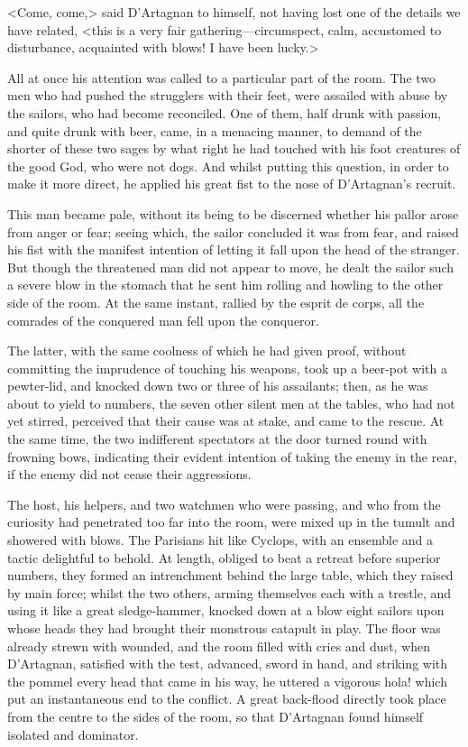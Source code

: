 <Come, come,> said D'Artagnan to himself, not having lost one of the details we have related, <this is a very fair gathering—circumspect, calm, accustomed to disturbance, acquainted with blows!  I have been lucky.>

All at once his attention was called to a particular part of the room. The two men who had pushed the strugglers with their feet, were assailed with abuse by the sailors, who had become reconciled. One of them, half drunk with passion, and quite drunk with beer, came, in a menacing manner, to demand of the shorter of these two sages by what right he had touched with his foot creatures of the good God, who were not dogs. And whilst putting this question, in order to make it more direct, he applied his great fist to the nose of D'Artagnan's recruit.

This man became pale, without its being to be discerned whether his pallor arose from anger or fear; seeing which, the sailor concluded it was from fear, and raised his fist with the manifest intention of letting it fall upon the head of the stranger. But though the threatened man did not appear to move, he dealt the sailor such a severe blow in the stomach that he sent him rolling and howling to the other side of the room. At the same instant, rallied by the esprit de corps, all the comrades of the conquered man fell upon the conqueror.

The latter, with the same coolness of which he had given proof, without committing the imprudence of touching his weapons, took up a beer-pot with a pewter-lid, and knocked down two or three of his assailants; then, as he was about to yield to numbers, the seven other silent men at the tables, who had not yet stirred, perceived that their cause was at stake, and came to the rescue. At the same time, the two indifferent spectators at the door turned round with frowning bows, indicating their evident intention of taking the enemy in the rear, if the enemy did not cease their aggressions.

The host, his helpers, and two watchmen who were passing, and who from the curiosity had penetrated too far into the room, were mixed up in the tumult and showered with blows. The Parisians hit like Cyclops, with an ensemble and a tactic delightful to behold. At length, obliged to beat a retreat before superior numbers, they formed an intrenchment behind the large table, which they raised by main force; whilst the two others, arming themselves each with a trestle, and using it like a great sledge-hammer, knocked down at a blow eight sailors upon whose heads they had brought their monstrous catapult in play. The floor was already strewn with wounded, and the room filled with cries and dust, when D'Artagnan, satisfied with the test, advanced, sword in hand, and striking with the pommel every head that came in his way, he uttered a vigorous hola! which put an instantaneous end to the conflict. A great back-flood directly took place from the centre to the sides of the room, so that D'Artagnan found himself isolated and dominator.

